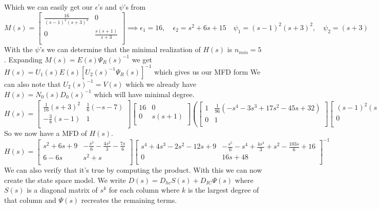 \documentclass{article}
\begin{document}
Which we can easily get our $\epsilon$'s and $\psi$'s from
$$
M(s) =
\begin{bmatrix}
\frac{16}{(s-1)^2(s+3)^2} & 0 \\
0 & \frac{s(s+1)}{s+3} \\
\end{bmatrix}
\implies
\epsilon_1 = 16, \quad \epsilon_2 = s^2+6s+15 \quad
\psi_1 = (s-1)^2(s+3)^2, \quad \psi_2 = (s+3)
$$
With the $\psi$'s we can determine that the minimal realization of $H(s)$ is $n_{min}=5$.
Expanding $M(s) = E(s)\Psi_R(s)^{-1}$ we get $H(s) = U_1(s)E(s)[U_2(s)^{-1}\Psi_R(s)]^{-1}$ which gives us our MFD form
We can also note that $U_2(s)^{-1} = V(s)$ which we already have
$ H(s) = N_0(s)D_0(s)^{-1} $ which will have minimal degree.
$$
H(s) =
\begin{bmatrix}
\frac{1}{16} (s+3)^2 & \frac{1}{6} (-s-7) \\
-\frac{3}{8} (s-1) & 1 \\
\end{bmatrix}
\begin{bmatrix}
16 & 0 \\
0 & s(s+1) \\
\end{bmatrix}
\left(
\begin{bmatrix}
1 & \frac{1}{96} \left(-s^4-3 s^3+17 s^2-45 s+32\right) \\
0 & 1 \\
\end{bmatrix}
\begin{bmatrix}
(s-1)^2(s+3)^2 & 0 \\
0 & 16(s+3) \\
\end{bmatrix}
\right)^{-1}
$$
So we now have a MFD of $H(s)$.
$$
H(s) =
\begin{bmatrix}
s^2+6 s+9 & -\frac{s^3}{6}-\frac{4 s^2}{3}-\frac{7 s}{6} \\
6-6 s & s^2+s \\
\end{bmatrix}
\begin{bmatrix}
s^4+4 s^3-2 s^2-12 s+9 & -\frac{s^5}{6}-s^4+\frac{4 s^3}{3}+s^2-\frac{103 s}{6}+16 \\
0 & 16 s+48 \\
\end{bmatrix}
^{-1}
$$
We can also verify that it's true by computing the product.
With this we can now create the state space model.
We write $D(s) = D_{hc}S(s) + D_{IC}\Psi(s)$ where $S(s)$ is a diagonal matrix of $s^k$ for each column where $k$ is the largest degree of that column and $\Psi(s)$ recreates the remaining terms.
\end{document}
